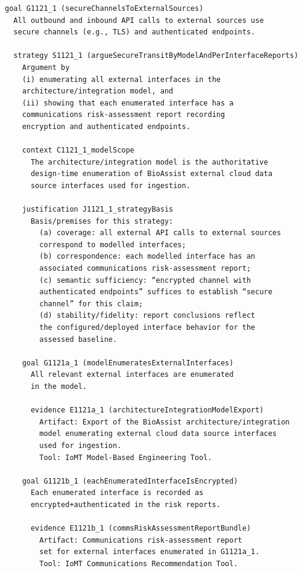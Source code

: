 \documentclass{article}
\begin{document}
\begin{Verbatim}[commandchars=\\\{\}]
goal G1121_1 (secureChannelsToExternalSources)
  All outbound and inbound API calls to external sources use
  secure channels (e.g., TLS) and authenticated endpoints.

  strategy S1121_1 (argueSecureTransitByModelAndPerInterfaceReports)
    Argument by
    (i) enumerating all external interfaces in the
    architecture/integration model, and
    (ii) showing that each enumerated interface has a
    communications risk-assessment report recording
    encryption and authenticated endpoints.

    context C1121_1_modelScope
      The architecture/integration model is the authoritative
      design-time enumeration of BioAssist external cloud data
      source interfaces used for ingestion.

    justification J1121_1_strategyBasis
      Basis/premises for this strategy:
        (a) coverage: all external API calls to external sources
        correspond to modelled interfaces;
        (b) correspondence: each modelled interface has an
        associated communications risk-assessment report;
        (c) semantic sufficiency: “encrypted channel with
        authenticated endpoints” suffices to establish “secure
        channel” for this claim;
        (d) stability/fidelity: report conclusions reflect
        the configured/deployed interface behavior for the
        assessed baseline.

    goal G1121a_1 (modelEnumeratesExternalInterfaces)
      All relevant external interfaces are enumerated
      in the model.

      evidence E1121a_1 (architectureIntegrationModelExport)
        Artifact: Export of the BioAssist architecture/integration
        model enumerating external cloud data source interfaces
        used for ingestion.
        Tool: IoMT Model-Based Engineering Tool.
    
    goal G1121b_1 (eachEnumeratedInterfaceIsEncrypted)
      Each enumerated interface is recorded as
      encrypted+authenticated in the risk reports.
            
      evidence E1121b_1 (commsRiskAssessmentReportBundle)
        Artifact: Communications risk-assessment report
        set for external interfaces enumerated in G1121a_1.
        Tool: IoMT Communications Recommendation Tool.
\end{Verbatim}
\end{document}
